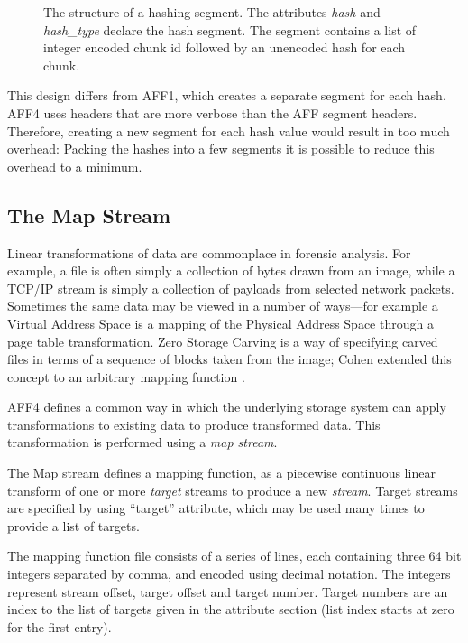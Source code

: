 \documentclass[10pt, conference]{IEEEtran}
\begin{document}
\begin{figure}[tb]
  \begin{center}
  \mbox{\columnwidth {}}
  \caption{The structure of a hashing segment. The attributes {\em
  hash} and {\em hash\_type} declare the hash segment. The segment
  contains a list of integer encoded chunk id followed by an unencoded
  hash for each chunk.}
  \label{hash_index}
  \end{center}
\end{figure}

This design differs from AFF1, which creates a separate segment for
each hash. AFF4 uses headers that are more verbose than the AFF
segment headers. Therefore, creating a new segment for each hash value
would result in too much overhead: Packing the hashes into a few
segments it is possible to reduce this overhead to a minimum.

\subsection{The Map Stream}
\label{map_stream}
Linear transformations of data are commonplace in forensic
analysis. For example, a file is often simply a collection of bytes
drawn from an image, while a TCP/IP stream is simply a collection of
payloads from selected network packets. 
Sometimes the same data may be
viewed in a number of ways---for example a Virtual Address Space is a
mapping of the Physical Address Space through a page table
transformation.  Zero Storage Carving \cite{Meijer2006} is a way of
specifying carved files in terms of a sequence of blocks taken from
the image; Cohen extended this concept to an arbitrary
mapping function\cite{Cohen2007} . 

AFF4 defines a common way in
which the underlying storage system can apply transformations to
existing data to produce transformed data. This transformation is
performed using a \emph{map stream}.

The Map stream defines a mapping function, as a piecewise continuous
linear transform of one or more {\em target} streams to produce a new
{\em stream}. Target streams are specified by using ``target''
attribute, which may be used many times to provide a list of targets.

The mapping function file consists of a series of lines, each
containing three 64 bit integers separated by comma, and encoded using
decimal notation. The integers represent stream offset, target offset
and target number. Target numbers are an index to the list of targets
given in the attribute section (list index starts at zero for the
first entry).
\end{document}
